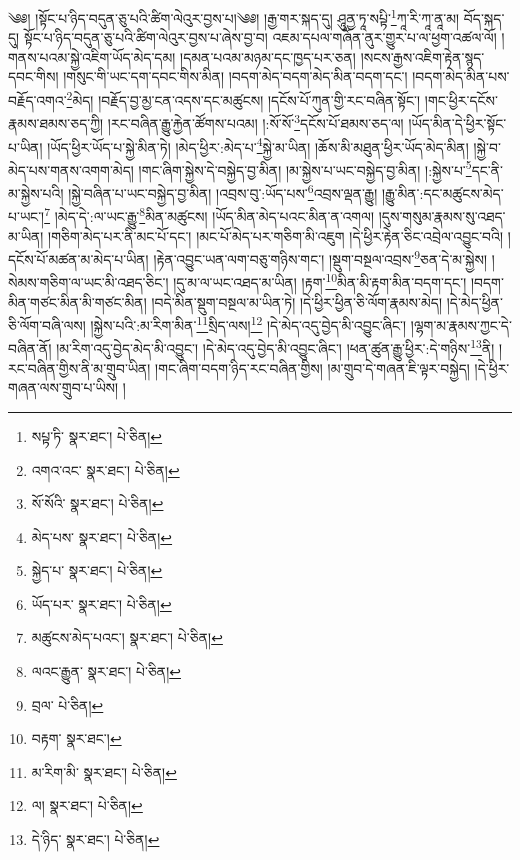 \setcounter{footnote}{0} 
༄༅། །སྟོང་པ་ཉིད་བདུན་ཅུ་པའི་ཚིག་ལེའུར་བྱས་པ།༄༅། །རྒྱ་གར་སྐད་དུ། ཤཱུནྱ་ཏཱ་སཔྟི་\footnote{སཔྟ་ཏི་  སྣར་ཐང་།  པེ་ཅིན། }ཀཱ་རི་ཀཱ་ནཱ་མ། བོད་སྐད་དུ། སྟོང་པ་ཉིད་བདུན་ཅུ་པའི་ཚིག་ལེའུར་བྱས་པ་ཞེས་བྱ་བ། འཇམ་དཔལ་གཞོན་ནུར་གྱུར་པ་ལ་ཕྱག་འཚལ་ལོ། །གནས་པའམ་སྐྱེ་འཇིག་ཡོད་མེད་དམ། །དམན་པའམ་མཉམ་དང་ཁྱད་པར་ཅན། །སངས་རྒྱས་འཇིག་རྟེན་སྙད་དབང་གིས། །གསུང་གི་ཡང་དག་དབང་གིས་མིན། །བདག་མེད་བདག་མེད་མིན་བདག་དང་། །བདག་མེད་མིན་པས་བརྗོད་འགའ་\footnote{འགའ་འང་  སྣར་ཐང་།  པེ་ཅིན། }མེད། །བརྗོད་བྱ་མྱ་ངན་འདས་དང་མཚུངས། །དངོས་པོ་ཀུན་གྱི་རང་བཞིན་སྟོང་། །གང་ཕྱིར་དངོས་རྣམས་ཐམས་ཅད་ཀྱི། །རང་བཞིན་རྒྱུ་རྐྱེན་ཚོགས་པའམ། །:སོ་སོ་\footnote{སོ་སོའི་  སྣར་ཐང་།  པེ་ཅིན། }དངོས་པོ་ཐམས་ཅད་ལ། །ཡོད་མིན་དེ་ཕྱིར་སྟོང་པ་ཡིན། །ཡོད་ཕྱིར་ཡོད་པ་སྐྱེ་མིན་ཏེ། །མེད་ཕྱིར་:མེད་པ་\footnote{མེད་པས་  སྣར་ཐང་།  པེ་ཅིན། }སྐྱེ་མ་ཡིན། །ཆོས་མི་མཐུན་ཕྱིར་ཡོད་མེད་མིན། །སྐྱེ་བ་མེད་པས་གནས་འགག་མེད། །གང་ཞིག་སྐྱེས་དེ་བསྐྱེད་བྱ་མིན། །མ་སྐྱེས་པ་ཡང་བསྐྱེད་བྱ་མིན། །:སྐྱེས་པ་\footnote{སྐྱེད་པ་  སྣར་ཐང་།  པེ་ཅིན། }དང་ནི་མ་སྐྱེས་པའི། །སྐྱེ་བཞིན་པ་ཡང་བསྐྱེད་བྱ་མིན། །འབྲས་བུ་:ཡོད་པས་\footnote{ཡོད་པར་  སྣར་ཐང་།  པེ་ཅིན། }འབྲས་ལྡན་རྒྱུ། །རྒྱུ་མིན་:དང་མཚུངས་མེད་པ་ཡང་།\footnote{མཚུངས་མེད་པའང་།  སྣར་ཐང་།  པེ་ཅིན། } །མེད་དེ་:ལ་ཡང་རྒྱུ་\footnote{ལའང་རྒྱུན་  སྣར་ཐང་།  པེ་ཅིན། }མིན་མཚུངས། །ཡོད་མིན་མེད་པའང་མིན་ན་འགལ། །དུས་གསུམ་རྣམས་སུ་འཐད་མ་ཡིན། །གཅིག་མེད་པར་ནི་མང་པོ་དང་། །མང་པོ་མེད་པར་གཅིག་མི་འཇུག །དེ་ཕྱིར་རྟེན་ཅིང་འབྲེལ་འབྱུང་བའི། །དངོས་པོ་མཚན་མ་མེད་པ་ཡིན། །རྟེན་འབྱུང་ཡན་ལག་བཅུ་གཉིས་གང་། །སྡུག་བསྔལ་འབྲས་\footnote{བྲལ་  པེ་ཅིན། }ཅན་དེ་མ་སྐྱེས། །སེམས་གཅིག་ལ་ཡང་མི་འཐད་ཅིང་། །དུ་མ་ལ་ཡང་འཐད་མ་ཡིན། །རྟག་\footnote{བརྟག་  སྣར་ཐང་། }མིན་མི་རྟག་མིན་བདག་དང་། །བདག་མིན་གཙང་མིན་མི་གཙང་མིན། །བདེ་མིན་སྡུག་བསྔལ་མ་ཡིན་ཏེ། །དེ་ཕྱིར་ཕྱིན་ཅི་ལོག་རྣམས་མེད། །དེ་མེད་ཕྱིན་ཅི་ལོག་བཞི་ལས། །སྐྱེས་པའི་:མ་རིག་མིན་\footnote{མ་རིག་མི་  སྣར་ཐང་།  པེ་ཅིན། }སྲིད་ལས།\footnote{ལ།  སྣར་ཐང་།  པེ་ཅིན། } །དེ་མེད་འདུ་བྱེད་མི་འབྱུང་ཞིང་། །ལྷག་མ་རྣམས་ཀྱང་དེ་བཞིན་ནོ། །མ་རིག་འདུ་བྱེད་མེད་མི་འབྱུང་། །དེ་མེད་འདུ་བྱེད་མི་འབྱུང་ཞིང་། །ཕན་ཚུན་རྒྱུ་ཕྱིར་:དེ་གཉིས་\footnote{དེ་ཉིད་  སྣར་ཐང་།  པེ་ཅིན། }ནི། །རང་བཞིན་གྱིས་ནི་མ་གྲུབ་ཡིན། །གང་ཞིག་བདག་ཉིད་རང་བཞིན་གྱིས། །མ་གྲུབ་དེ་གཞན་ཇི་ལྟར་བསྐྱེད། །དེ་ཕྱིར་གཞན་ལས་གྲུབ་པ་ཡིས། །

